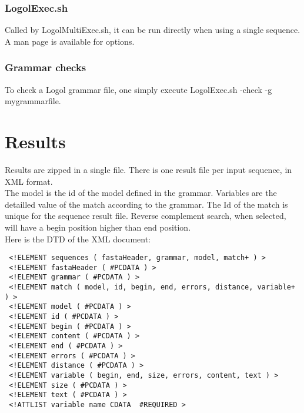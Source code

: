 \documentclass[11pt]{article}
\begin{document}
\subsubsection{LogolExec.sh}

Called by LogolMultiExec.sh, it can be run directly when using a single sequence. A man page is available for options.


\subsubsection{Grammar checks}

To check a Logol grammar file, one simply execute LogolExec.sh -check -g mygrammarfile.

\section{Results}

Results are zipped in a single file. There is one result file per input sequence, in XML format.\\
The model is the id of the model defined in the grammar. Variables are the detailled value of the match according to the grammar. The Id of the match is unique for the sequence result file. Reverse complement search, when selected, will have a begin position higher than end position.\\
Here is the DTD of the XML document:\\
{\small
\begin{verbatim}
 <!ELEMENT sequences ( fastaHeader, grammar, model, match+ ) >
 <!ELEMENT fastaHeader ( #PCDATA ) >
 <!ELEMENT grammar ( #PCDATA ) >
 <!ELEMENT match ( model, id, begin, end, errors, distance, variable+ ) >
 <!ELEMENT model ( #PCDATA ) >
 <!ELEMENT id ( #PCDATA ) >
 <!ELEMENT begin ( #PCDATA ) >
 <!ELEMENT content ( #PCDATA ) >
 <!ELEMENT end ( #PCDATA ) >
 <!ELEMENT errors ( #PCDATA ) >
 <!ELEMENT distance ( #PCDATA ) >
 <!ELEMENT variable ( begin, end, size, errors, content, text ) >
 <!ELEMENT size ( #PCDATA ) >
 <!ELEMENT text ( #PCDATA ) >
 <!ATTLIST variable name CDATA  #REQUIRED >
\end{verbatim}
}
\end{document}
